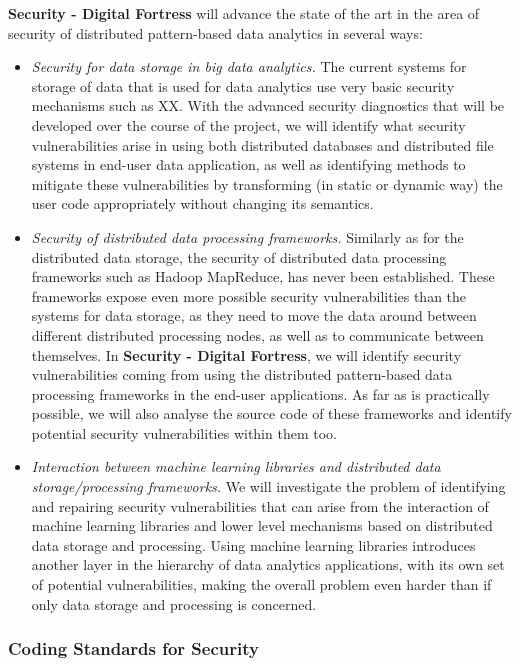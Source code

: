 \documentclass[a4paper,11pt]{article}
\newcommand{\project}[1]{\textbf{#1}\xspace}
\newcommand{\SECURITY}{\project{Security - Digital Fortress}}
\newcommand{\TheProject}{\SECURITY}
\begin{document}
\begin{mdframed}[backgroundcolor=gray!10]
\TheProject{} will advance the state of the art in the area of security of distributed pattern-based data analytics in several ways:
\begin{itemize}
\item \emph{Security for data storage in big data analytics.} The current systems for storage of data that is used for data analytics use very basic security mechanisms such as XX. With the advanced security diagnostics that will be developed over the course of the project, we will identify what security vulnerabilities arise in using both distributed databases and distributed file systems in end-user data application, as well as identifying methods to mitigate these vulnerabilities by transforming (in static or dynamic way) the user code appropriately without changing its semantics. 
\item \emph{Security of distributed data processing frameworks.} Similarly as for the distributed data storage, the security of distributed data processing frameworks such as Hadoop MapReduce, has never been established. These frameworks expose even more possible security vulnerabilities than the systems for data storage, as they need to move the data around between different distributed processing nodes, as well as to communicate between themselves. In \TheProject{}, we will identify security vulnerabilities coming from using the distributed pattern-based data processing frameworks in the end-user applications. As far as is practically possible, we will also analyse the source code of these frameworks and identify potential security vulnerabilities within them too.
\item \emph{Interaction between machine learning libraries and distributed data storage/processing frameworks.} We will investigate the problem of identifying and repairing security vulnerabilities that can arise from the interaction of machine learning libraries and lower level mechanisms based on distributed data storage and processing. Using machine learning libraries introduces another layer in the hierarchy of data analytics applications, with its own set of potential vulnerabilities, making the overall problem even harder than if only data storage and processing is concerned. 
\end{itemize}
\end{mdframed}

\subsubsection{Coding Standards for Security}
\label{sect:codingStandards}
\end{document}
